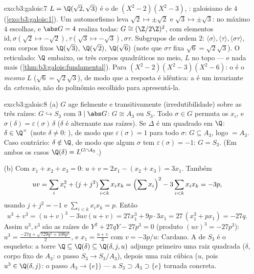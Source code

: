 \begin{solution}{exo:b3:galois:7}
$L = \Q(\sqrt2, \sqrt3)$ é o  de $(X^2 -
2)(X^2 - 3)$, : galoisiano de  $4$
(\cref{exo:b3:galois:1}). Um automorfismo leva $\sqrt2 \mapsto
\pm\sqrt2$ e $\sqrt3 \mapsto \pm\sqrt3$: no máximo $4$ escolhas,
e $\abs G = 4$ realiza todas: $G \cong (\Z/2\Z)^2$, com
elementos $\mathrm{id}, \sigma (\sqrt2 \mapsto -\sqrt2), \tau
(\sqrt3\mapsto-\sqrt3), \sigma\tau$. Subgrupos de ordem $2$:
$\langle\sigma\rangle, \langle\tau\rangle,
\langle\sigma\tau\rangle$, com corpos fixos $\Q(\sqrt3)$,
$\Q(\sqrt2)$, $\Q(\sqrt6)$ (note que $\sigma\tau$ fixa $\sqrt6 =
\sqrt2\sqrt3$). O reticulado: $\Q$ embaixo, os três corpos
quadráticos no meio, $L$ no topo --- e nada mais
(\cref{thm:b3:galois:fundamental}). Para $(X^2-2)(X^2-3)(X^2-6)$:
o  é o \emph{mesmo} $L$ ($\sqrt6 =
\sqrt2\sqrt3$), de modo que a resposta é idêntica: a
 é um invariante da \emph{extensão}, não do
polinômio escolhido para apresentá-la.
\end{solution}

\begin{solution}{exo:b3:galois:8}
(a) $G$ age fielmente e transitivamente (irredutibilidade) sobre as
três raízes: $G \hookrightarrow S_3$ com $3 \mid \abs G$: $G
\cong A_3$ ou $S_3$. Todo $\sigma \in G$ permuta os $x_i$, e
$\sigma(\delta) = \varepsilon(\sigma)\,\delta$ ($\delta$ é
alternante nas raízes). Se $\Delta$ é um quadrado em $\Q$:
$\delta \in \Q^\times$ (note $\delta \neq 0$: ), de modo que
$\varepsilon(\sigma) = 1$ para todo $\sigma$: $G \subseteq A_3$,
logo $= A_3$. Caso contrário: $\delta \notin \Q$, de modo que algum $\sigma$ tem
$\varepsilon(\sigma) = -1$: $G = S_3$. (Em ambos os casos $\Q(\delta)
= L^{G \cap A_3}$.)

(b) Com $x_1 + x_2 + x_3 = 0$: $u + v = 2x_1 - (x_2 + x_3) =
3x_1$. Também
\[
uv = \sum_i x_i^2 + (j + j^2)\sum_{i<k}x_ix_k
= \Bigl(\sum x_i\Bigr)^2 - 3\sum_{i<k}x_ix_k = -3p,
\]
usando $j + j^2 = -1$ e $\sum_{i<k}x_ix_k = p$. Então
\[
u^3 + v^3 = (u+v)^3 - 3uv(u+v) = 27x_1^3 + 9p\cdot 3x_1
= 27\,(x_1^3 + px_1) = -27q .
\]
Assim $u^3, v^3$ são as raízes de $Y^2 + 27qY - 27p^3 = 0$
(produto $(uv)^3 = -27p^3$): $u^3 = \frac{-27q +
\sqrt{729q^2 + 108p^3}}2$, e $x_1 = \frac{u + v}3$ com $v =
-3p/u$: Cardano. A  de $S_3$ é o esqueleto: a
torre $\Q \subseteq \Q(\delta) \subseteq \Q(\delta, j, u)$
adjunge primeiro uma raiz quadrada ($\delta$, corpo fixo de $A_3$:
o passo $S_3 \to S_3/A_3$), depois uma raiz cúbica ($u$, pois $u^3
\in \Q(\delta, j)$: o passo $A_3 \to \{e\}$) --- a  $S_3 \supset A_3 \supset \{e\}$ tornada concreta.
\end{solution}

